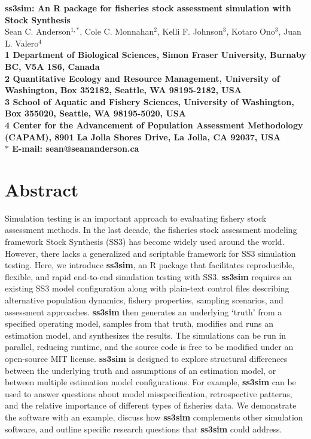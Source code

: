\documentclass[11pt]{article}
\date{}
\begin{document}
\begin{spacing}{1.2}
\begin{flushleft}
{\Large
\textbf{ss3sim: An \textsf{R} package for fisheries stock assessment simulation with Stock Synthesis}
}
\\
Sean C. Anderson$^{1,\ast}$,
Cole C. Monnahan$^{2}$,
Kelli F. Johnson$^{3}$,
Kotaro Ono$^{3}$,
Juan L. Valero$^{4}$
\\
\bf{1} Department of Biological Sciences,
Simon Fraser University,
Burnaby BC, V5A 1S6, Canada
\\
\bf{2} Quantitative Ecology and Resource Management,
University of Washington, Box 352182,
Seattle, WA 98195-2182, USA
\\
\bf{3} School of Aquatic and Fishery Sciences,
University of Washington, Box 355020,
Seattle, WA 98195-5020, USA
\\
\bf{4} Center for the Advancement of Population Assessment Methodology
(CAPAM), 8901 La Jolla Shores Drive, La Jolla, CA 92037, USA
\\
$\ast$ E-mail: sean@seananderson.ca
\end{flushleft}



%
\section*{Abstract}

Simulation testing is an important approach to evaluating fishery stock
assessment methods. In the last decade, the fisheries stock assessment modeling
framework Stock Synthesis (SS3) has become widely used around the world.
However, there lacks a generalized and scriptable framework for SS3 simulation
testing. Here, we introduce \textbf{ss3sim}, an \textsf{R} package that
facilitates reproducible, flexible, and rapid end-to-end simulation
testing with SS3. \textbf{ss3sim} requires an existing SS3 model configuration
along with plain-text control files describing alternative population dynamics,
fishery properties, sampling scenarios, and assessment approaches.
\textbf{ss3sim} then generates an underlying `truth' from a specified
operating model, samples from that truth, modifies and runs an estimation
model, and synthesizes the results. The simulations can be run in parallel,
reducing runtime, and the source code is free to be modified under an
open-source MIT license. \textbf{ss3sim} is designed to explore structural
differences between the underlying truth and assumptions of an estimation
model, or between multiple estimation model configurations. For example,
\textbf{ss3sim} can be used to answer questions about model misspecification,
retrospective patterns, and the relative importance of different types of
fisheries data. We demonstrate the software with an example, discuss how
\textbf{ss3sim} complements other simulation software, and outline specific
research questions that \textbf{ss3sim} could address.


\end{spacing}
\end{document}
